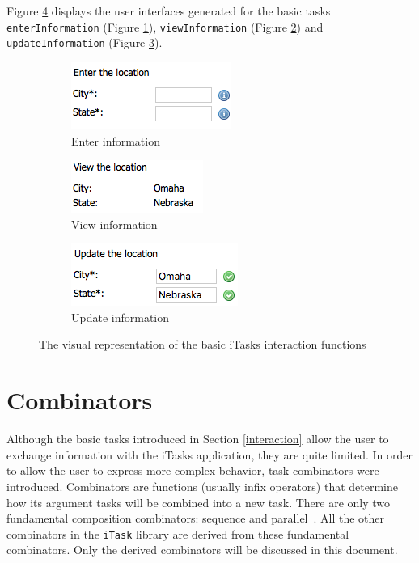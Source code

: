 Figure \ref{fig:itasks_display} displays the user interfaces generated for the basic tasks \texttt{enterInformation} (Figure \ref{fig:enter_info}), \texttt{viewInformation} (Figure \ref{fig:view_info}) and \texttt{updateInformation} (Figure \ref{fig:upd_info}).

\begin{figure}[H]
\begin{subfigure}{0.33\textwidth}
\includegraphics[scale=0.7]{thesis/img/enter_location.png}
\caption{Enter information}
\label{fig:enter_info}
\end{subfigure}
\begin{subfigure}{0.33\textwidth}
\includegraphics[scale=0.55]{thesis/img/view_location.png}
\caption{View information}
\label{fig:view_info}
\end{subfigure}
\begin{subfigure}{0.33\textwidth}
\includegraphics[scale=0.7]{thesis/img/update_location.png}
\caption{Update information}
\label{fig:upd_info}
\end{subfigure}
\caption{The visual representation of the basic iTasks interaction functions}
\label{fig:itasks_display}
\end{figure}


\section{Combinators}\label{combinators}

Although the basic tasks introduced in Section \ref{interaction} allow the user to exchange information with the iTasks application, they are quite limited. In order to allow the user to express more complex behavior, task combinators were introduced. Combinators are functions (usually infix operators) that determine how its argument tasks will be combined into a new task. There are only two fundamental composition combinators: sequence and parallel~\cite{top_fl}. All the other combinators in the \texttt{iTask} library are derived from these fundamental combinators. Only the derived combinators will be discussed in this document.

